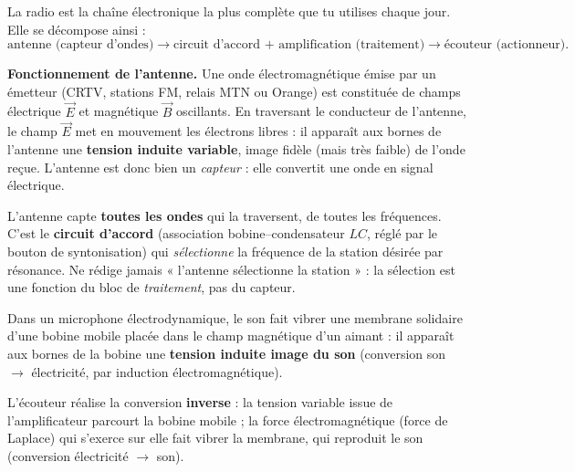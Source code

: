 \documentclass[11pt]{article}
\newcommand{\cle}[1]{{\popxbold\color{popdark}#1}}
\begin{document}
La radio est la chaîne électronique la plus complète que tu utilises chaque jour. Elle se décompose ainsi :
\[
\text{antenne (capteur d'ondes)} \longrightarrow \text{circuit d'accord + amplification (traitement)} \longrightarrow \text{écouteur (actionneur)}.
\]

\textbf{Fonctionnement de l'antenne.} Une onde électromagnétique émise par un émetteur (CRTV, stations FM, relais MTN ou Orange) est constituée de champs électrique $\vec{E}$ et magnétique $\vec{B}$ oscillants. En traversant le conducteur de l'antenne, le champ $\vec{E}$ met en mouvement les électrons libres : il apparaît aux bornes de l'antenne une \textbf{tension induite variable}, image fidèle (mais très faible) de l'onde reçue. L'antenne est donc bien un \emph{capteur} : elle convertit une onde en signal électrique.

\begin{attention}
L'antenne capte \textbf{toutes les ondes} qui la traversent, de toutes les fréquences. C'est le \textbf{circuit d'accord} (association bobine--condensateur $LC$, réglé par le bouton de syntonisation) qui \emph{sélectionne} la fréquence de la station désirée par résonance. Ne rédige jamais « l'antenne sélectionne la station » : la sélection est une fonction du bloc de \emph{traitement}, pas du capteur.
\end{attention}

\begin{propriete}
Dans un \cle{microphone électrodynamique}, le son fait vibrer une membrane solidaire d'une bobine mobile placée dans le champ magnétique d'un aimant : il apparaît aux bornes de la bobine une \textbf{tension induite image du son} (conversion son $\to$ électricité, par induction électromagnétique).

L'\cle{écouteur} réalise la conversion \textbf{inverse} : la tension variable issue de l'amplificateur parcourt la bobine mobile ; la force électromagnétique (force de Laplace) qui s'exerce sur elle fait vibrer la membrane, qui reproduit le son (conversion électricité $\to$ son).
\end{propriete}
\end{document}
